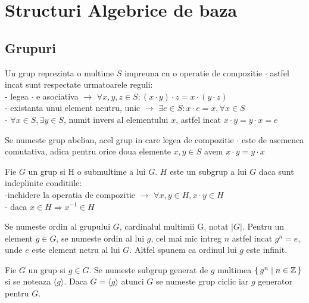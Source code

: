 %
%
\let\textcircled=\pgftextcircled

\chapter{Structuri Algebrice de baza} 
\section{Grupuri}
\label{sec:sec01}

\begin{dfn}
Un grup reprezinta o multime $S$ impreuna cu o operatie de compozitie $\cdot$ astfel incat sunt respectate urmatoarele reguli:
\\ - legea $\cdot$ e asociativa $\rightarrow$ $\forall x, y, z\in S: (x\cdot y)\cdot z = x\cdot (y \cdot z)$
\\ - existanta unui element neutru, unic $\rightarrow$ $\exists e\in S: x \cdot e = x, \forall x\in S$
\\ - $\forall x\in S, \exists y\in S$, numit invers al elementului $x$, astfel incat $x\cdot y = y\cdot x = e$
\end{dfn}

\begin{dfn}
Se numeste grup abelian, acel grup in care legea de compozitie $\cdot$ este de asemenea comutativa, adica pentru orice doua elemente
$x, y \in S$ avem $x \cdot y = y \cdot x$
\end{dfn}

\begin{dfn}
Fie $G$ un grup si H o submultime a lui $G$. $H$ este un subgrup a lui $G$ daca sunt indeplinite conditiile:
\\ -inchidere la operatia de compozitie $\rightarrow$ $\forall x, y \in H, x \cdot y \in H$
\\ - daca $x \in H \Rightarrow x^{-1} \in H$
\end{dfn}

\begin{dfn}
Se numeste ordin al grupului $G$, cardinalul multimii G, notat $|G|$. Pentru un element $g \in G$, se numeste ordin al lui $g$, cel mai
mic intreg $n$ astfel incat $g^n = e$, unde $e$ este element netru al lui $G$. Altfel spunem ca ordinul lui $g$ este infinit.
\end{dfn}

\begin{dfn}
Fie $G$ un grup si $g \in G$. Se numeste subgrup generat de $g$ multimea $\set{g^n\mid n\in \mathbb{Z}}$ si se noteaza $\langle g \rangle$. Daca $G = \langle g \rangle$ atunci $G$ se numeste grup ciclic iar $g$ generator pentru $G$.
\end{dfn}



